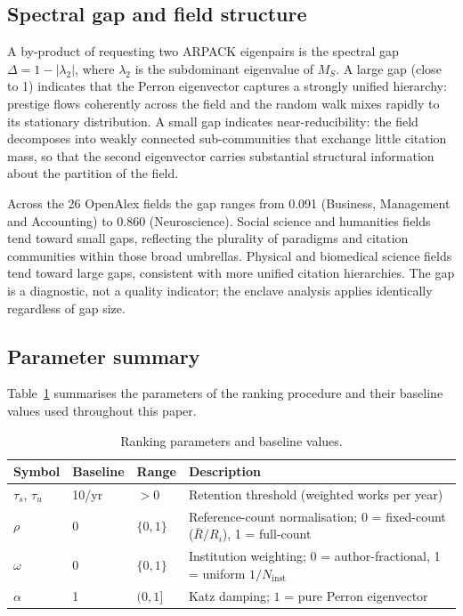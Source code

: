 \subsection{Spectral gap and field structure}

A by-product of requesting two ARPACK eigenpairs is the spectral gap
$\Delta = 1 - |\lambda_2|$, where $\lambda_2$ is the subdominant eigenvalue
of $M_S$.  A large gap (close to 1) indicates that the Perron eigenvector
captures a strongly unified hierarchy: prestige flows coherently across the
field and the random walk mixes rapidly to its stationary distribution.  A
small gap indicates near-reducibility: the field decomposes into weakly
connected sub-communities that exchange little citation mass, so that the
second eigenvector carries substantial structural information about the
partition of the field.

Across the 26 OpenAlex fields the gap ranges from 0.091 (Business, Management
and Accounting) to 0.860 (Neuroscience).  Social science and humanities fields
tend toward small gaps, reflecting the plurality of paradigms and citation
communities within those broad umbrellas.  Physical and biomedical science
fields tend toward large gaps, consistent with more unified citation hierarchies.
The gap is a diagnostic, not a quality indicator; the enclave analysis applies
identically regardless of gap size.

\subsection{Parameter summary}

Table~\ref{tab:params} summarises the parameters of the ranking procedure and
their baseline values used throughout this paper.

\begin{table}[ht]
\centering
\caption{Ranking parameters and baseline values.}
\label{tab:params}
\begin{tabular}{lllp{6.2cm}}
\toprule
Symbol & Baseline & Range & Description \\
\midrule
$\tau_s$, $\tau_u$ & 10/yr & $>0$ & Retention threshold (weighted works per year) \\
$\rho$ & 0 & $\{0,1\}$ & Reference-count normalisation; 0 = fixed-count ($\bar{R}/R_i$), 1 = full-count \\
$\omega$ & 0 & $\{0,1\}$ & Institution weighting; 0 = author-fractional, 1 = uniform $1/N_{\mathrm{inst}}$ \\
$\alpha$ & 1 & $(0,1]$ & Katz damping; $1$ = pure Perron eigenvector \\
\bottomrule
\end{tabular}
\end{table}
